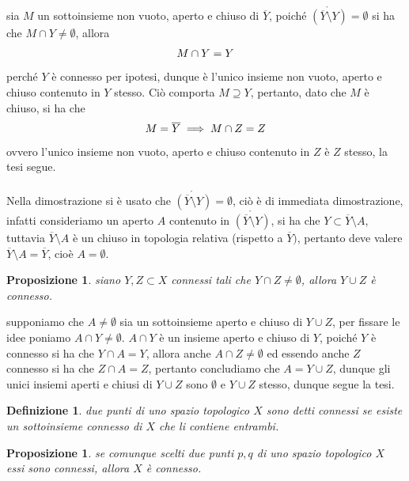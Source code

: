 \documentclass[oneside, 11pt]{amsbook}
\makeatletter
\newcommand{\0}{{(0)}}
\newcommand{\3}{{(3)}}
\theoremstyle{colonplain}
\newtheorem{prop}[thm]{Proposizione}
\theoremstyle{colondefinition}
\newtheorem{defn}[thm]{Definizione}
\theoremstyle{colonremark}
\numberwithin{equation}{chapter}
\renewcommand{\proofname}{Dimostrazione}
\renewenvironment{proof}[1][\proofname]{\par
  \pushQED{\qed}%
  \normalfont \topsep6\p@\@plus6\p@\relax
  \trivlist
  \item[\hskip\labelsep\bfseries #1:]\ignorespaces
}{%
  \popQED\endtrivlist\@endpefalse
}
\makeatother
\begin{document}
\begin{proof}
sia $M$ un sottoinsieme non vuoto, aperto e chiuso di $\overline{Y}$, poiché $\mathring{(\overline{Y} \setminus Y)} = \emptyset$ si ha che $M \cap Y \neq \emptyset$, allora
\begin{align}
    M \cap Y = Y \notag
\end{align}
perché $Y$ è connesso per ipotesi, dunque è l'unico insieme non vuoto, aperto e chiuso contenuto in $Y$ stesso. Ciò comporta $M \supseteq Y$, pertanto, dato che $M$ è chiuso, si ha che
\begin{align}
    M = \overline{Y} \implies M \cap Z = Z \notag
\end{align}
ovvero l'unico insieme non vuoto, aperto e chiuso contenuto in $Z$ è $Z$ stesso, la tesi segue. \\ \\
Nella dimostrazione si è usato che $\mathring{(\overline{Y} \setminus Y)} = \emptyset$, ciò è di immediata dimostrazione, infatti consideriamo un aperto $A$ contenuto in $\mathring{(\overline{Y} \setminus Y)}$, si ha che $Y \subset \overline{Y} \setminus A$, tuttavia $\overline{Y} \setminus A$ è un chiuso in topologia relativa (rispetto a $\overline{Y})$, pertanto deve valere $\overline{Y} \setminus A = \overline{Y}$, cioè $A = \emptyset$.
\end{proof}
\begin{prop}\label{ConctNonEmptyIntrs}
siano $Y, Z \subset X$ connessi tali che $Y \cap Z \neq \emptyset$, allora $Y \cup Z$ è connesso.
\end{prop}
\begin{proof}
supponiamo che $A \neq \emptyset$ sia un sottoinsieme aperto e chiuso di $Y \cup Z$, per fissare le idee poniamo $A \cap Y \neq \emptyset$. $A \cap Y$ è un insieme aperto e chiuso di $Y$, poiché $Y$ è connesso si ha che $Y \cap A = Y$, allora anche $A \cap Z \neq \emptyset$ ed essendo anche $Z$ connesso si ha che $Z \cap A = Z$, pertanto concludiamo che $A = Y \cup Z$, dunque gli unici insiemi aperti e chiusi di $Y \cup Z$ sono $\emptyset$ e $Y \cup Z$ stesso, dunque segue la tesi.
\end{proof}
\begin{defn}
due punti di uno spazio topologico $X$ sono detti \textit{connessi} se esiste un sottoinsieme connesso di $X$ che li contiene entrambi.
\end{defn}
\begin{prop}\label{CarattConct}
se comunque scelti due punti $p, q$ di uno spazio topologico $X$ essi sono connessi, allora $X$ è connesso.
\end{prop}
\end{document}

